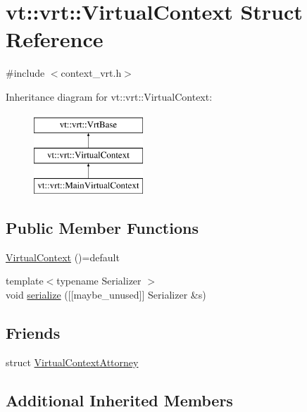 \hypertarget{structvt_1_1vrt_1_1_virtual_context}{}\section{vt\+:\+:vrt\+:\+:Virtual\+Context Struct Reference}
\label{structvt_1_1vrt_1_1_virtual_context}


{\ttfamily \#include $<$context\+\_\+vrt.\+h$>$}

Inheritance diagram for vt\+:\+:vrt\+:\+:Virtual\+Context\+:\begin{figure}[H]
\begin{center}
\leavevmode
\includegraphics[height=3.000000cm]{structvt_1_1vrt_1_1_virtual_context}
\end{center}
\end{figure}
\subsection*{Public Member Functions}
\begin{DoxyCompactItemize}
\item 
\hyperlink{structvt_1_1vrt_1_1_virtual_context_a9958f214ea97abc63031ad1e02fffee8}{Virtual\+Context} ()=default
\item 
{\footnotesize template$<$typename Serializer $>$ }\\void \hyperlink{structvt_1_1vrt_1_1_virtual_context_a72f97ad1a17c6868e6b5db02ada493cf}{serialize} (\mbox{[}\mbox{[}maybe\+\_\+unused\mbox{]}\mbox{]} Serializer \&s)
\end{DoxyCompactItemize}
\subsection*{Friends}
\begin{DoxyCompactItemize}
\item 
struct \hyperlink{structvt_1_1vrt_1_1_virtual_context_a3c098ac4f050b85316f4ae9eef22a43e}{Virtual\+Context\+Attorney}
\end{DoxyCompactItemize}
\subsection*{Additional Inherited Members}


